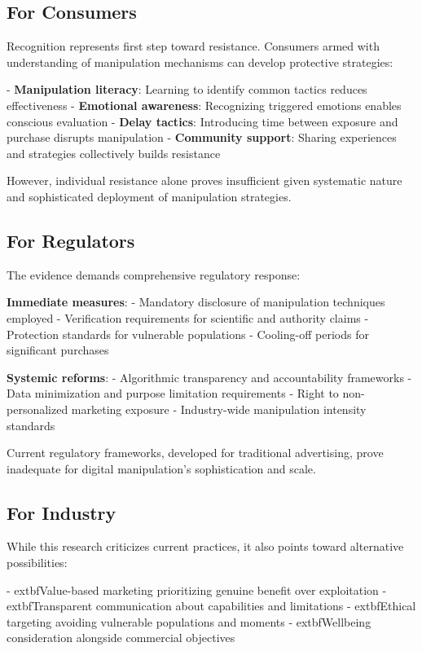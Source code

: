 \subsection{For Consumers}

Recognition represents first step toward resistance. Consumers armed with understanding of manipulation mechanisms can develop protective strategies:

- \textbf{Manipulation literacy}: Learning to identify common tactics reduces effectiveness
- \textbf{Emotional awareness}: Recognizing triggered emotions enables conscious evaluation
- \textbf{Delay tactics}: Introducing time between exposure and purchase disrupts manipulation
- \textbf{Community support}: Sharing experiences and strategies collectively builds resistance

However, individual resistance alone proves insufficient given systematic nature and sophisticated deployment of manipulation strategies.

\subsection{For Regulators}

The evidence demands comprehensive regulatory response:

\textbf{Immediate measures}:
- Mandatory disclosure of manipulation techniques employed
- Verification requirements for scientific and authority claims  
- Protection standards for vulnerable populations
- Cooling-off periods for significant purchases

\textbf{Systemic reforms}:
- Algorithmic transparency and accountability frameworks
- Data minimization and purpose limitation requirements
- Right to non-personalized marketing exposure
- Industry-wide manipulation intensity standards

Current regulatory frameworks, developed for traditional advertising, prove inadequate for digital manipulation's sophistication and scale.

\subsection{For Industry}

While this research criticizes current practices, it also points toward alternative possibilities:

- 	extbf{Value-based marketing} prioritizing genuine benefit over exploitation
- 	extbf{Transparent communication} about capabilities and limitations
- 	extbf{Ethical targeting} avoiding vulnerable populations and moments
- 	extbf{Wellbeing consideration} alongside commercial objectives

